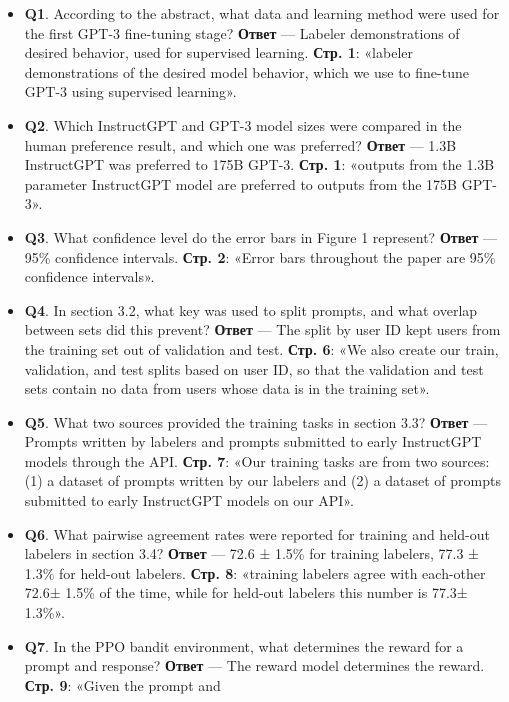 \documentclass[12pt,a4paper]{article}
\providecommand{\tightlist}{\setlength{\itemsep}{0pt}\setlength{\parskip}{0pt}}
\begin{document}
\begin{itemize}
\tightlist
\item
  \textbf{Q1}. According to the abstract, what data and learning method
  were used for the first GPT-3 fine-tuning stage? \textbf{Ответ} ---
  Labeler demonstrations of desired behavior, used for supervised
  learning. \textbf{Стр. 1}: «labeler demonstrations of the desired
  model behavior, which we use to fine-tune GPT-3 using supervised
  learning».
\item
  \textbf{Q2}. Which InstructGPT and GPT-3 model sizes were compared in
  the human preference result, and which one was preferred?
  \textbf{Ответ} --- 1.3B InstructGPT was preferred to 175B GPT-3.
  \textbf{Стр. 1}: «outputs from the 1.3B parameter InstructGPT model
  are preferred to outputs from the 175B GPT-3».
\item
  \textbf{Q3}. What confidence level do the error bars in Figure 1
  represent? \textbf{Ответ} --- 95\% confidence intervals. \textbf{Стр.
  2}: «Error bars throughout the paper are 95\% confidence intervals».
\item
  \textbf{Q4}. In section 3.2, what key was used to split prompts, and
  what overlap between sets did this prevent? \textbf{Ответ} --- The
  split by user ID kept users from the training set out of validation
  and test. \textbf{Стр. 6}: «We also create our train, validation, and
  test splits based on user ID, so that the validation and test sets
  contain no data from users whose data is in the training set».
\item
  \textbf{Q5}. What two sources provided the training tasks in section
  3.3? \textbf{Ответ} --- Prompts written by labelers and prompts
  submitted to early InstructGPT models through the API. \textbf{Стр.
  7}: «Our training tasks are from two sources: (1) a dataset of prompts
  written by our labelers and (2) a dataset of prompts submitted to
  early InstructGPT models on our API».
\item
  \textbf{Q6}. What pairwise agreement rates were reported for training
  and held-out labelers in section 3.4? \textbf{Ответ} --- 72.6 ± 1.5\%
  for training labelers, 77.3 ± 1.3\% for held-out labelers.
  \textbf{Стр. 8}: «training labelers agree with each-other 72.6± 1.5\%
  of the time, while for held-out labelers this number is 77.3± 1.3\%».
\item
  \textbf{Q7}. In the PPO bandit environment, what determines the reward
  for a prompt and response? \textbf{Ответ} --- The reward model
  determines the reward. \textbf{Стр. 9}: «Given the prompt and

\end{itemize}
\end{document}
